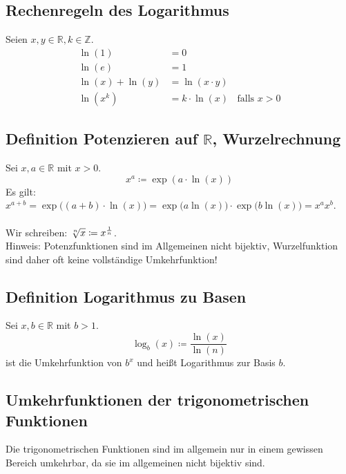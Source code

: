 \documentclass[halfparscip]{scrartcl}
\newcounter{subsection2}
\begin{document}
\subsection*{Rechenregeln des Logarithmus}
Seien $x,y \in \mathbb{R}, k \in \mathbb{Z}$.
\begin{align*}
	\ln(1) &= 0 \\
	\ln(e) &= 1 \\
	\ln(x) + \ln(y) &= \ln(x \cdot y)\\
	\ln(x^k) &= k \cdot \ln(x)\;\;\text{ falls }x > 0
\end{align*}

\subsection{Definition Potenzieren auf $\mathbb{R}$, Wurzelrechnung}
Sei $x,a \in \mathbb{R}$ mit $x > 0$.
\begin{equation*}
	x^a \coloneqq \exp(a \cdot \ln(x))
\end{equation*}
Es gilt: $x^{a+b} = \exp\big((a+b) \cdot \ln(x)\big) = \exp\big(a \ln(x)\big)\cdot \exp\big(b \ln(x)\big) = x^ax^b$.\\\\
Wir schreiben: $\sqrt[\uproot{1}n]{x} \coloneqq x^\frac{1}{n}$.\\
Hinweis: Potenzfunktionen sind im Allgemeinen nicht bijektiv, Wurzelfunktion sind daher oft keine vollständige Umkehrfunktion!

\subsection*{Definition Logarithmus zu Basen}
Sei $x, b \in \mathbb{R}$ mit $b > 1$.
\begin{equation*}
	\log_b(x) \coloneqq \frac{\ln(x)}{\ln(n)}
\end{equation*}
ist die Umkehrfunktion von $b^x$ und heißt Logarithmus zur Basis $b$.

\subsection*{Umkehrfunktionen der trigonometrischen Funktionen}
Die trigonometrischen Funktionen sind im allgemein nur in einem gewissen Bereich umkehrbar, da sie im allgemeinen nicht bijektiv sind.
\end{document}

